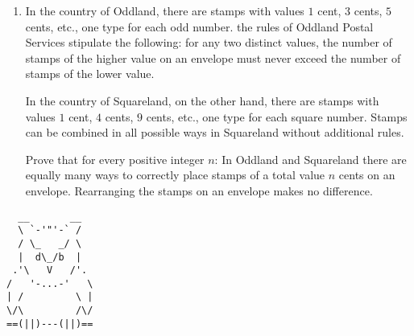 \documentclass{article}
\begin{document}
\begin{enumerate}[1.]
\vfill

\item %
In the country of Oddland, there are stamps with values $1$ cent, $3$ cents, $5$ cents, etc., one type for each odd number.
the rules of Oddland Postal Services stipulate the following: for any two distinct values, the number of stamps of the higher value on an envelope must never exceed the number of stamps of the lower value.

In the country of Squareland, on the other hand, there are stamps with values $1$ cent, $4$ cents, $9$ cents, etc., one type for each square number.
Stamps can be combined in all possible ways in Squareland without additional rules.

Prove that for every positive integer $n$:
In Oddland and Squareland there are equally many ways to correctly place stamps of a total value $n$ cents on an envelope.
Rearranging the stamps on an envelope makes no difference.


\end{enumerate}


\vfill
\vfill

\begin{center}
\begin{BVerbatim}
  __       __
  \ `-'"'-` /
  / \_   _/ \
  |  d\_/b  |
 .'\   V   /'.
/   '-...-'   \
| /         \ |
\/\         /\/
==(||)---(||)==
\end{BVerbatim}
\end{center}
\end{document}
